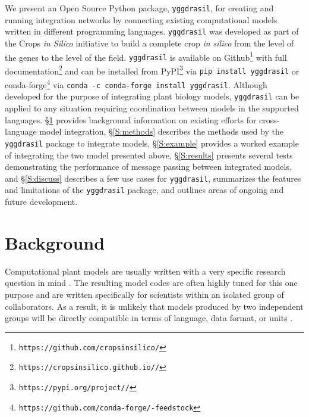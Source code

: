 \documentclass[journal]{IEEEtran}
\newcommand{\todo}[1]{{\color{red}{#1}}}
\newcommand{\pkg}{{\tt yggdrasil}{}}
\newcommand{\pkglink}{\todo{cis\_interface}}
\begin{document}
We present an Open Source Python package, {\pkg}, for creating and running integration networks by connecting existing computational models written in different programming languages. {\pkg} was developed as part of the Crops \emph{in Silico} \citep{Marshall-Colon2017} initiative to build a complete crop \emph{in silico} from the level of the genes to the level of the field. {\pkg} is available on Github\footnote{{\tt https://github.com/cropsinsilico/\pkglink}} with full documentation\footnote{{\tt https://cropsinsilico.github.io/\pkglink/}} and can be installed from PyPI\footnote{{\tt https://pypi.org/project/\pkglink/}} via {\tt pip install {\pkg}} or conda-forge\footnote{{\tt https://github.com/conda-forge/\pkglink-feedstock}} via {\tt conda -c conda-forge install {\pkg}}. Although developed for the purpose of integrating plant biology models, {\pkg} can be applied to any situation requiring coordination between models in the supported languages. \S\ref{S:background} provides background information on existing efforts for cross-language model integration, \S\ref{S:methods} describes the methods used by the {\pkg} package to integrate models, \S\ref{S:example} provides a worked example of integrating the two model presented above, \S\ref{S:results} presents several tests demonstrating the performance of message passing between integrated models, and \S\ref{S:discuss} describes a few use cases for {\pkg}, 
summarizes the features and limitations of the {\pkg} package, and outlines areas of ongoing and future development.

\section{Background}\label{S:background}
%
Computational plant models are usually written with a very specific research question in mind \citep[e.g. describing a specific metabolic pathway in C4 photosynthesis,][]{Wang2014}. The resulting model codes are often highly tuned for this one purpose and are written specifically for scientists within an isolated group of collaborators. As a result, it is unlikely that models produced by two independent groups will be directly compatible in terms of language, data format, or units \citep{Marshall-Colon2017}. 
\end{document}
